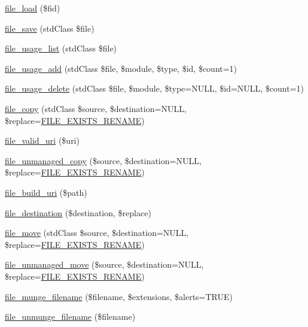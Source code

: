 \begin{DoxyCompactItemize}
\item 
\hyperlink{group__file_ga138bd2e393c743b41a642003eecbf98f}{file\_\-load} (\$fid)
\item 
\hyperlink{group__file_ga80327cb23d8d384b827b2637cd8cc4ba}{file\_\-save} (stdClass \$file)
\item 
\hyperlink{group__file_ga6399c4096559ffbe81cfcb22db782bc4}{file\_\-usage\_\-list} (stdClass \$file)
\item 
\hyperlink{group__file_ga41a98960234fa8f802cfc1c4c769ae05}{file\_\-usage\_\-add} (stdClass \$file, \$module, \$type, \$id, \$count=1)
\item 
\hyperlink{group__file_gaf8562c4494373ec51079bb0999a8ae3a}{file\_\-usage\_\-delete} (stdClass \$file, \$module, \$type=NULL, \$id=NULL, \$count=1)
\item 
\hyperlink{group__file_gae49a2da7203ef43ae7adcf128d58d860}{file\_\-copy} (stdClass \$source, \$destination=NULL, \$replace=\hyperlink{group__file_ga5d6636d4ccd022885823b91f17a0f464}{FILE\_\-EXISTS\_\-RENAME})
\item 
\hyperlink{group__file_gad84d226f677dd5b6e53519026b7de67e}{file\_\-valid\_\-uri} (\$uri)
\item 
\hyperlink{group__file_ga19b0d88682d26b7e5d03cb22ac2af391}{file\_\-unmanaged\_\-copy} (\$source, \$destination=NULL, \$replace=\hyperlink{group__file_ga5d6636d4ccd022885823b91f17a0f464}{FILE\_\-EXISTS\_\-RENAME})
\item 
\hyperlink{group__file_ga6855ddd89be373ff7ea584d2ec66ea9a}{file\_\-build\_\-uri} (\$path)
\item 
\hyperlink{group__file_ga3136d98d6189607e6cba12aaff55c66d}{file\_\-destination} (\$destination, \$replace)
\item 
\hyperlink{group__file_gad6f4eec44e0c32bf0cde6c602d5da38f}{file\_\-move} (stdClass \$source, \$destination=NULL, \$replace=\hyperlink{group__file_ga5d6636d4ccd022885823b91f17a0f464}{FILE\_\-EXISTS\_\-RENAME})
\item 
\hyperlink{group__file_ga3fd3a919ca321ec8c5bd1e4b069237a1}{file\_\-unmanaged\_\-move} (\$source, \$destination=NULL, \$replace=\hyperlink{group__file_ga5d6636d4ccd022885823b91f17a0f464}{FILE\_\-EXISTS\_\-RENAME})
\item 
\hyperlink{group__file_gae5f97959982c78dfde2f806757c21368}{file\_\-munge\_\-filename} (\$filename, \$extensions, \$alerts=TRUE)
\item 
\hyperlink{group__file_gabda71018b91068bcd9fcd527a0493347}{file\_\-unmunge\_\-filename} (\$filename)
\item 

\end{DoxyCompactItemize}
